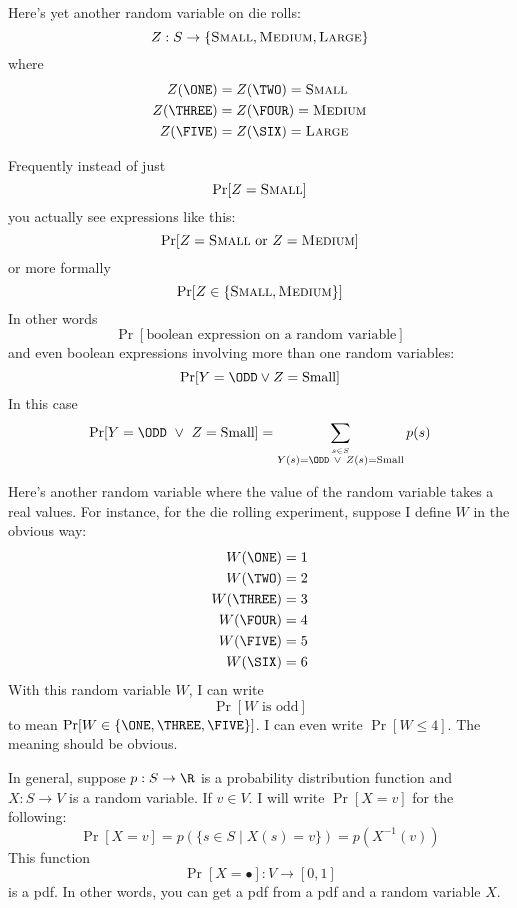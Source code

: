 Here's yet another random variable on die rolls:
\[
Z : S \rightarrow \{ \textsc{Small}, \textsc{Medium}, \textsc{Large} \}
\]
where
\begin{align*}
Z(\ONE) &= Z(\TWO) = \textsc{Small} \\
Z(\THREE) &= Z(\FOUR) = \textsc{Medium} \\
Z(\FIVE) &= Z(\SIX) = \textsc{Large}
\end{align*}

Frequently instead of just
\[
  \Pr[Z = \textsc{Small}]
\]
you actually see expressions like this:
\[
  \Pr[Z = \textsc{Small} \text{ or } Z = \textsc{Medium}]
\]
or more formally
\[
  \Pr[Z \in \{\textsc{Small}, \textsc{Medium}\}]
\]
In other words
\[
  \Pr[\text{boolean expression on a random variable}]  
\]
and even boolean expressions involving more than one random variables:
\[
\Pr[Y = \ODD \lor Z = \text{Small}]  
\]
In this case
\[
\Pr[Y = \ODD \ \lor \ Z = \text{Small}]
=
\sum_{\stackrel{s \in S}{Y(s) = \ODD \ \lor \ Z(s) = \text{Small}}} p(s)
\]


Here's another random variable where the value of the random variable
takes a real values.
For instance, for the die rolling experiment, suppose I define $W$
in the obvious way:
\begin{align*}
W(\ONE) &= 1 \\
W(\TWO) &= 2 \\
W(\THREE) &= 3 \\
W(\FOUR) &= 4 \\
W(\FIVE) &= 5 \\
W(\SIX) &= 6 \\
\end{align*}
With this random variable $W$, I can write
\[
\Pr[W \text{ is odd}]
\]
to mean
$\Pr[W \in \{\ONE, \THREE, \FIVE\}]$.
I can even write
$\Pr[W \leq 4]$.
The meaning should be obvious.

In general, suppose $p : S \rightarrow \R$ is a probability distribution function
and $X : S \rightarrow V$ is a random variable.
If $v \in V$.
I will write $\Pr[X = v]$ for the following: 
\[
\Pr[X = v] = p(\{s \in S \mid X(s) = v \}) = p(X^{-1}(v))
\]
This function
\[
  \Pr[X = \bullet] : V \rightarrow [0, 1]
\]
is a pdf.
In other words, you can get a pdf from a pdf and a random variable $X$.

